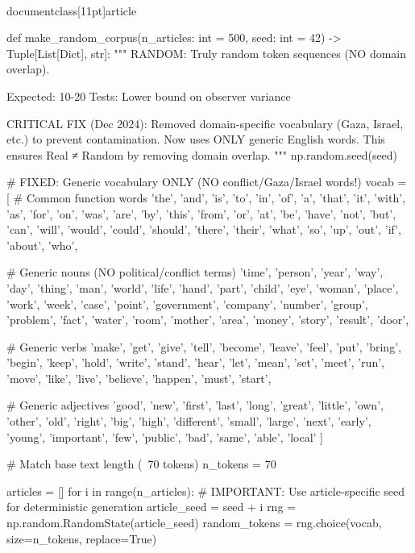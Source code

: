 \\documentclass[11pt]{article}
\begin{document}
\begin{CodeBlock}
{{def make_random_corpus(n_articles: int = 500, seed: int = 42) -> Tuple[List[Dict], str]:
    """
    RANDOM: Truly random token sequences (NO domain overlap).
    
    Expected: 10-20%
    Tests: Lower bound on observer variance
    
    CRITICAL FIX (Dec 2024): Removed domain-specific vocabulary (Gaza, Israel, etc.)
    to prevent contamination. Now uses ONLY generic English words.
    This ensures Real ≠ Random by removing domain overlap.
    """
    np.random.seed(seed)
    
    # FIXED: Generic vocabulary ONLY (NO conflict/Gaza/Israel words!)
    vocab = [
        # Common function words
        'the', 'and', 'is', 'to', 'in', 'of', 'a', 'that', 'it', 'with',
        'as', 'for', 'on', 'was', 'are', 'by', 'this', 'from', 'or', 'at',
        'be', 'have', 'not', 'but', 'can', 'will', 'would', 'could', 'should',
        'there', 'their', 'what', 'so', 'up', 'out', 'if', 'about', 'who',
        
        # Generic nouns (NO political/conflict terms)
        'time', 'person', 'year', 'way', 'day', 'thing', 'man', 'world', 'life',
        'hand', 'part', 'child', 'eye', 'woman', 'place', 'work', 'week', 'case',
        'point', 'government', 'company', 'number', 'group', 'problem', 'fact',
        'water', 'room', 'mother', 'area', 'money', 'story', 'result', 'door',
        
        # Generic verbs
        'make', 'get', 'give', 'tell', 'become', 'leave', 'feel', 'put', 'bring',
        'begin', 'keep', 'hold', 'write', 'stand', 'hear', 'let', 'mean', 'set',
        'meet', 'run', 'move', 'like', 'live', 'believe', 'happen', 'must', 'start',
        
        # Generic adjectives
        'good', 'new', 'first', 'last', 'long', 'great', 'little', 'own', 'other',
        'old', 'right', 'big', 'high', 'different', 'small', 'large', 'next', 'early',
        'young', 'important', 'few', 'public', 'bad', 'same', 'able', 'local'
    ]
    
    # Match base text length (~70 tokens)
    n_tokens = 70
    
    articles = []
    for i in range(n_articles):
        # IMPORTANT: Use article-specific seed for deterministic generation
        article_seed = seed + i
        rng = np.random.RandomState(article_seed)
        random_tokens = rng.choice(vocab, size=n_tokens, replace=True)
        
}}
\end{CodeBlock}
\end{document}
